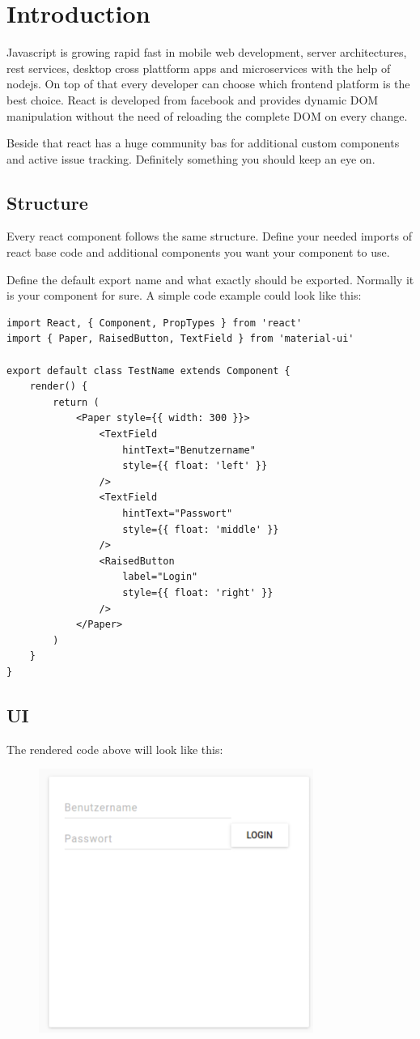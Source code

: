 \chapter{Introduction}
Javascript is growing rapid fast in mobile web development, server architectures, rest services, desktop cross plattform apps and microservices with the help of nodejs. On top of that every developer can choose which frontend platform is the best choice. React is developed from facebook and provides dynamic DOM manipulation without the need of reloading the complete DOM on every change.

Beside that react has a huge community bas for additional custom components and active issue tracking. Definitely something you should keep an eye on.

\section{Structure}
Every react component follows the same structure. Define your needed imports of react base code and additional components you want your component to use.

Define the default export name and what exactly should be exported. Normally it is your component for sure. A simple code example could look like this:

\begin{lstlisting}
import React, { Component, PropTypes } from 'react'
import { Paper, RaisedButton, TextField } from 'material-ui'

export default class TestName extends Component {
	render() {
		return (
			<Paper style={{ width: 300 }}>
				<TextField
					hintText="Benutzername"
					style={{ float: 'left' }}
				/>
				<TextField
					hintText="Passwort"
					style={{ float: 'middle' }}
				/>
				<RaisedButton
					label="Login"
					style={{ float: 'right' }}
				/>
			</Paper>
		)
	}
}
\end{lstlisting}

\section{UI}
The rendered code above will look like this:
  \begin{figure}[htb!]
	\centerline{\includegraphics[width=0.8\textwidth]{resources/preview.png}}
\end{figure}